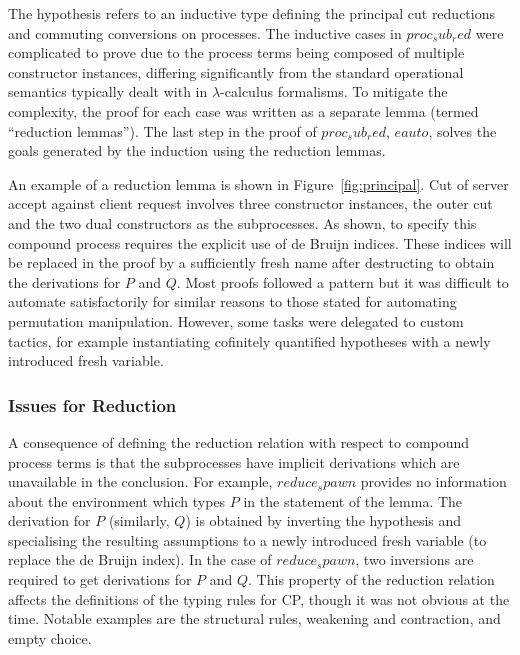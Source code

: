 

The  hypothesis refers to an inductive type defining the principal
cut reductions and commuting conversions on processes. The inductive cases in
\coqe$proc_sub_red$ were complicated to prove due to the process terms being
composed of multiple constructor instances, differing significantly from the
standard operational semantics typically dealt with in $\lambda$-calculus
formalisms. To mitigate the complexity, the proof for each case was written as
a separate lemma (termed ``reduction lemmas''). The last step in the proof of
\coqe$proc_sub_red$, \coqe$eauto$, solves the goals generated by the induction
using the reduction lemmas.

An example of a reduction lemma is shown in Figure~\ref{fig:principal}. Cut of
server accept against client request involves three constructor instances, the
outer cut and the two dual constructors as the subprocesses. As shown, to
specify this compound process requires the explicit use of de Bruijn
indices. These indices will be replaced in the proof by a sufficiently fresh
name after destructing  to obtain the derivations for \coqe$P$ and
\coqe$Q$. Most proofs followed a pattern but it was difficult to automate
satisfactorily for similar reasons to those stated for automating permutation
manipulation. However, some tasks were delegated to custom tactics, for
example instantiating cofinitely quantified hypotheses with a newly introduced
fresh variable.

\subsubsection{Issues for Reduction}

A consequence of defining the reduction relation with respect to compound
process terms is that the subprocesses have implicit derivations which are
unavailable in the conclusion. For example, \coqe$reduce_spawn$ provides no
information about the environment which types \coqe$P$ in the statement of the
lemma. The derivation for \coqe$P$ (similarly, \coqe$Q$) is obtained by
inverting the hypothesis  and specialising the resulting assumptions
to a newly introduced fresh variable (to replace the de Bruijn index). In the
case of \coqe$reduce_spawn$, two inversions are required to get derivations
for \coqe$P$ and \coqe$Q$. This property of the reduction relation affects the
definitions of the typing rules for CP, though it was not obvious at the time.
Notable examples are the structural rules, weakening and contraction, and
empty choice.


